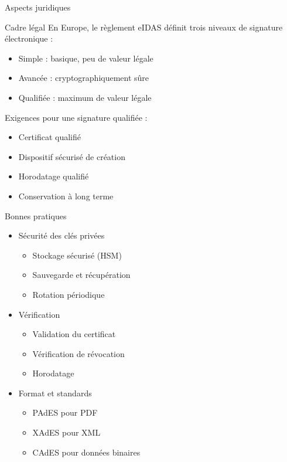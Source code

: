 \begin{frame}{Aspects juridiques}
  \begin{block}{Cadre légal}
    En Europe, le règlement eIDAS définit trois niveaux de signature électronique :
    \begin{itemize}
      \item Simple : basique, peu de valeur légale
      \item Avancée : cryptographiquement sûre
      \item Qualifiée : maximum de valeur légale
    \end{itemize}
  \end{block}

  Exigences pour une signature qualifiée :
  \begin{itemize}
    \item Certificat qualifié
    \item Dispositif sécurisé de création
    \item Horodatage qualifié
    \item Conservation à long terme
  \end{itemize}
\end{frame}

\begin{frame}{Bonnes pratiques}
  \begin{itemize}
    \item Sécurité des clés privées
      \begin{itemize}
        \item Stockage sécurisé (HSM)
        \item Sauvegarde et récupération
        \item Rotation périodique
      \end{itemize}
    \item Vérification
      \begin{itemize}
        \item Validation du certificat
        \item Vérification de révocation
        \item Horodatage
      \end{itemize}
    \item Format et standards
      \begin{itemize}
        \item PAdES pour PDF
        \item XAdES pour XML
        \item CAdES pour données binaires
      \end{itemize}
  \end{itemize}
\end{frame}